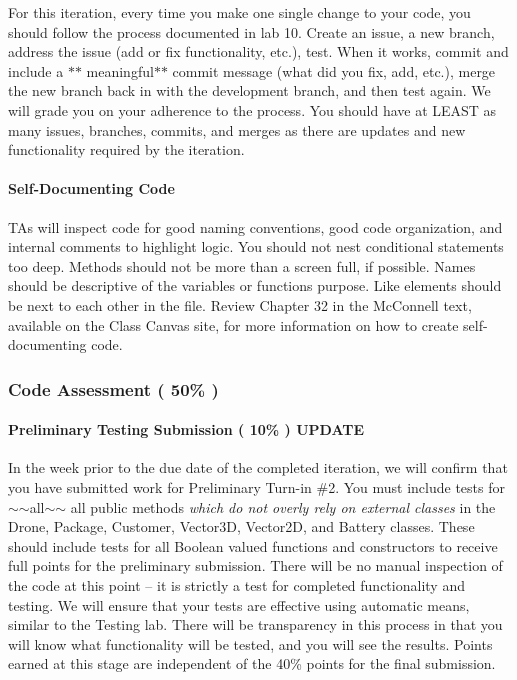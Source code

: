 For this iteration, every time you make one single change to your code, you should follow the process documented in lab 10. Create an issue, a new branch, address the issue (add or fix functionality, etc.), test. When it works, commit and include a $\ast$$\ast$ meaningful$\ast$$\ast$ commit message (what did you fix, add, etc.), merge the new branch back in with the development branch, and then test again. We will grade you on your adherence to the process. You should have at L\+E\+A\+ST as many issues, branches, commits, and merges as there are updates and new functionality required by the iteration.

\paragraph*{Self-\/\+Documenting Code}

T\+As will inspect code for good naming conventions, good code organization, and internal comments to highlight logic. You should not nest conditional statements too deep. Methods should not be more than a screen full, if possible. Names should be descriptive of the variable\textquotesingle{}s or function\textquotesingle{}s purpose. Like elements should be next to each other in the file. Review Chapter 32 in the Mc\+Connell text, available on the Class Canvas site, for more information on how to create self-\/documenting code.

\subsubsection*{Code Assessment ( 50\% )}

\paragraph*{Preliminary Testing Submission ( 10\% ) {\bfseries U\+P\+D\+A\+TE}}

In the week prior to the due date of the completed iteration, we will confirm that you have submitted work for Preliminary Turn-\/in \#2. You must include tests for $\sim$$\sim$all$\sim$$\sim$ all public methods {\itshape which do not overly rely on external classes} in the Drone, Package, Customer, Vector3D, Vector2D, and Battery classes. These should include tests for all Boolean valued functions and constructors to receive full points for the preliminary submission. There will be no manual inspection of the code at this point -- it is strictly a test for completed functionality and testing. We will ensure that your tests are effective using automatic means, similar to the Testing lab. There will be transparency in this process in that you will know what functionality will be tested, and you will see the results. Points earned at this stage are independent of the 40\% points for the final submission.

